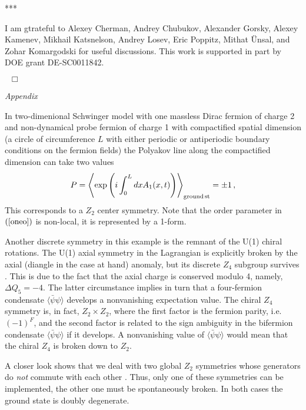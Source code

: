 \documentclass[epsfig,12pt]{article}
\newcommand{\beq}{\begin{equation}}
\newcommand{\eeq}{\end{equation}}
\newcommand*\DAlambert{\mathop{}\!\mathbin\Box}
\begin{document}
\centerline{***}


I am gtrateful to Alexey Cherman, Andrey Chubukov, Alexander Gorsky, Alexey Kamenev, Mikhail Katsnelson, Andrey Losev, Eric Poppitz, Mithat \"Unsal, and Zohar Komargodski for useful discussions. This work is supported in part by DOE grant DE-SC0011842.

\begin{flushright}
$\DAlambert$
\end{flushright}

\vspace{-7mm}

\begin{center}
\em \large
Appendix

\end{center}
\label{app}

In two-dimenional Schwinger model with one massless Dirac fermion of charge 2 and non-dynamical probe fermion of charge 1 with  compactified  spatial dimension (a circle of circumference $L$ with either periodic or antiperiodic boundary conditions on the fermion fields)  the Polyakov line along the compactified dimension can take two values
\beq
P = \left\langle   \exp\left( i \int_0^{L} dx A_1(x,t)\right)\right\rangle_{\rm ground\, st} = \pm 1\,,
\label{oneo}
\eeq
This corresponds to a $Z_2$ center symmetry. Note that the order parameter in $(\ref{oneo})$ is non-local, it is represented by a 1-form.

Another discrete symmetry in this example is the remnant of the U(1) chiral rotations. The U(1) axial symmetry in the Lagrangian is explicitly broken by the axial (diangle in the case at hand) anomaly,
but its discrete $Z_4$ subgroup survives \cite{shia}. This is due to the fact that the axial charge is conserved modulo 4, namely, $\Delta Q_5 = -4$. The latter circumstance implies in turn
that a four-fermion condensate $\langle\bar\psi \psi\rangle $ develops a nonvanishing expectation value. 
The chiral $Z_4$ symmetry is, in fact, $Z_2\times Z_2$, where the first factor is the fermion parity, i.e. $(-1)^F$, and the second factor is related to the sign ambiguity in the bifermion condensate 
$\langle\bar\psi \psi\rangle $ if it develops. A nonvanishing value of $\langle\bar\psi \psi\rangle $ would mean that the chiral $Z_4$ is broken down to $Z_2$.

A closer look shows that we deal with two global $Z_2$ symmetries whose generators do {\em not} commute with each other \cite{da1}. Thus, only one of these symmetries can be implemented, the other one must be spontaneously broken. In both cases the ground state is doubly degenerate. 
\end{document}
